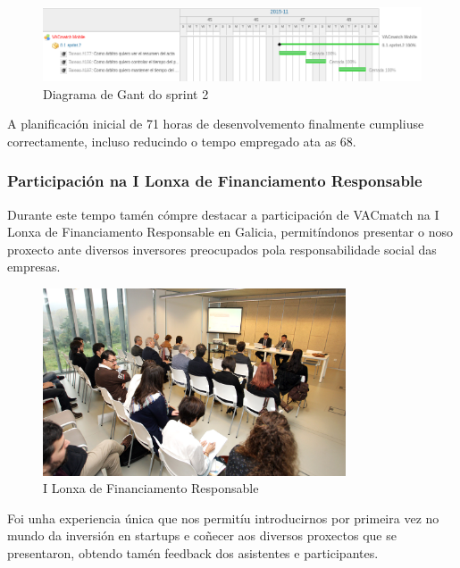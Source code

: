         \begin{figure}[h!]
          \begin{center}
          \includegraphics[width=\textwidth]{./img/gant_diagrams/02.png}
          \caption{Diagrama de Gant do sprint 2}
          \label{fig:gant01}
          \end{center}
        \end{figure}

  A planificación inicial de 71 horas de desenvolvemento finalmente cumpliuse 
correctamente, incluso reducindo o tempo empregado ata as 68.

    \subsubsection{Participación na I Lonxa de Financiamento Responsable}
    \label{sec:lonxa}
    Durante este tempo tamén cómpre destacar a participación de VACmatch na I 
Lonxa de Financiamento Responsable en Galicia, permitíndonos presentar o noso 
proxecto ante diversos inversores preocupados pola responsabilidade social das 
empresas.

    \begin{figure}[h!]
          \begin{center}
          \includegraphics[width=0.8\textwidth]{./img/inversion_responsable.jpg}
          \caption{I Lonxa de Financiamento Responsable}
          \label{fig:lonxa}
          \end{center}
    \end{figure}

        Foi unha experiencia única que nos permitíu introducirnos por primeira 
vez no mundo da inversión en startups e coñecer aos diversos proxectos que se 
presentaron, obtendo tamén feedback dos asistentes e participantes.

